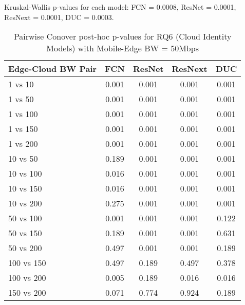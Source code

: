 \begin{table}[h]
\centering
\caption{Pairwise Conover post-hoc p-values for RQ6 (Cloud Identity Models) with Mobile-Edge BW = 50Mbps}
\label{tab:conover_cloud_identity_me50}
\smallskip
Kruskal-Wallis p-values for each model: FCN = 0.0008, ResNet = 0.0001, ResNext = 0.0001, DUC = 0.0003.

\begin{tabular}{lcccc}
\toprule
Edge-Cloud BW Pair & FCN & ResNet & ResNext & DUC \\
\midrule
1 vs 10 & 0.001 & 0.001 & 0.001 & 0.001 \\
1 vs 50 & 0.001 & 0.001 & 0.001 & 0.001 \\
1 vs 100 & 0.001 & 0.001 & 0.001 & 0.001 \\
1 vs 150 & 0.001 & 0.001 & 0.001 & 0.001 \\
1 vs 200 & 0.001 & 0.001 & 0.001 & 0.001 \\
10 vs 50 & 0.189 & 0.001 & 0.001 & 0.001 \\
10 vs 100 & 0.016 & 0.001 & 0.001 & 0.001 \\
10 vs 150 & 0.016 & 0.001 & 0.001 & 0.001 \\
10 vs 200 & 0.275 & 0.001 & 0.001 & 0.001 \\
50 vs 100 & 0.001 & 0.001 & 0.001 & 0.122 \\
50 vs 150 & 0.189 & 0.001 & 0.001 & 0.631 \\
50 vs 200 & 0.497 & 0.001 & 0.001 & 0.189 \\
100 vs 150 & 0.497 & 0.189 & 0.497 & 0.378 \\
100 vs 200 & 0.005 & 0.189 & 0.016 & 0.016 \\
150 vs 200 & 0.071 & 0.774 & 0.924 & 0.189 \\
\bottomrule
\end{tabular}
\end{table}

